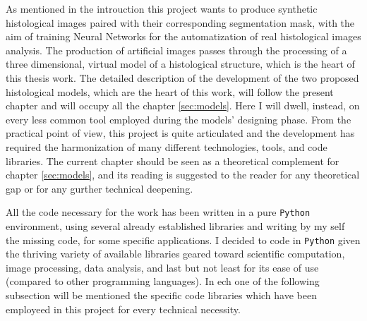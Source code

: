 As mentioned in the introuction this project wants to produce synthetic histological images paired with their corresponding segmentation mask, with  the aim of training Neural Networks for the automatization of real histological images analysis. The production of artificial images passes through the processing of a three dimensional, virtual model of a histological structure, which is the heart of this thesis work. The detailed description of the development of the two proposed histological models, which are the heart of this work, will follow the present chapter and will occupy all the chapter \ref{sec:models}. Here I will dwell, instead, on every less common tool employed during the models' designing phase. From the practical point of view, this project is quite articulated and the development has required the harmonization of many different technologies, tools, and code libraries. The current chapter should be seen as a theoretical complement for chapter \ref{sec:models}, and its reading is suggested to the reader for any theoretical gap or for any gurther technical deepening.

All the code necessary for the work has been written in a pure \texttt{Python} environment, using several already established libraries and writing by my self the missing code, for some specific applications. I decided to code in \texttt{Python} given the thriving variety of available libraries geared toward scientific computation, image processing, data analysis, and last but not least for its ease of use (compared to other programming languages). In ech one of the following subsection will be mentioned the specific code libraries which have been employeed in this project for every technical necessity.
